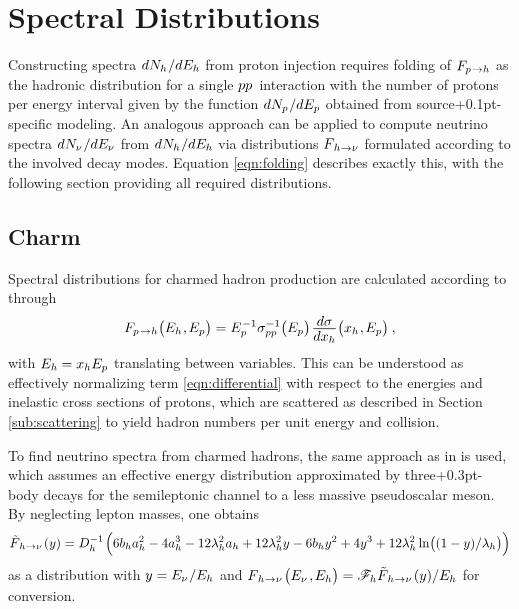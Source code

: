 \section{Spectral Distributions}
\label{sec:spectral}

Constructing spectra $dN_h \kern+0.5pt / dE_h$ from proton injection requires folding of $F_{p \kern+0.8pt \rightarrow h}$ as
the hadronic distribution for a single $p \kern-0.1pt p \kern+0.9pt$ interaction with the number of protons per energy interval
given by the function $dN_p \kern+0.6pt / dE_p$ obtained from source{\kern+0.1pt}-specific modeling. An analogous approach can
be applied to compute neutrino spectra $dN_\nu \kern+0.6pt / dE_\nu$ from $dN_h \kern+0.5pt / dE_h$ via distributions
$F_{\kern+1.0pt h \kern+0.2pt \rightarrow \nu}$ formulated according to the involved decay modes. Equation \eqref{eqn:folding}
describes exactly this, with the following section providing all required distributions.



\subsection{Charm}
\label{sub:charm}

Spectral distributions for charmed hadron production are calculated according to \cite{Carpio_2020} through
\begin{equation*}
	F_{p \kern+0.8pt \rightarrow h} \bigl( E_h \kern+0.5pt , \kern-0.5pt E_p \bigr) =
	E_p^{\kern+0.5pt -1} \sigma_{p \kern-0.1pt p}^{-1} \bigl( E_p \bigr) \kern+1.0pt
	\frac{\raisebox{-0.5ex}{$d\sigma$}}{\raisebox{0.5ex}{$dx_h$}} \bigl( x_h \kern+0.5pt, \kern-0.5pt E_p \bigr) \: ,
\end{equation*}
with $E_h \kern-0.2pt = x_h E_p$ translating between variables. This can be understood as effectively normalizing term
\eqref{eqn:differential} with respect to the energies and inelastic cross sections of protons, which are scattered as described in
Section \ref{sub:scattering} to yield hadron numbers per unit energy and collision.

To find neutrino spectra from charmed hadrons, the same approach as in \cite{Bhattacharya_2016} is used, which assumes an
effective energy distribution approximated by three{\kern+0.3pt}-body decays for the semileptonic channel to a less massive
pseudoscalar meson. By neglecting lepton masses, one obtains
\begin{equation*}
	\tilde{F}_{\kern+1.0pt h \kern+0.2pt \rightarrow \nu \kern+1.0pt} (y) = D_h^{-1} \kern+1.0pt \Bigl( 6b_ha_h^2 - 4a_h^3
	- 12\lambda_h^2 a_h + 12\lambda_h^2 y - 6b_h y^2 + 4 y^3 + 12 \lambda_h^2 \ln \bigl((1 - y) / \lambda_h \bigr) \Bigr)
\end{equation*}
as a distribution with $y = E_\nu \kern+0.6pt / E_h$ and $F_{\kern+1.0pt h \kern+0.2pt \rightarrow \nu \kern+1.0pt}
\bigl( E_\nu \kern+1.0pt , \kern-0.5pt E_h \bigr) = \mathscr{F}_h \tilde{F}_{\kern+1.0pt h \kern+0.2pt \rightarrow \nu \kern+1.0pt}
(y) / E_h$ for conversion.

